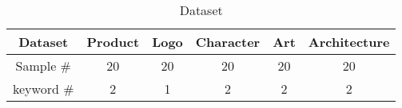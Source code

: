 \begin{table}[ht]
\vspace{-0.1in}
\caption{Dataset}
\label{table:table0}
\centering
    \begin{adjustbox}{width=0.6\linewidth}
        \small 
        \begin{tabular}{cccccc}
            \toprule
            Dataset&Product&Logo&Character&Art& Architecture\\
            \midrule
            Sample \#&20&20&20&20&20\\
            keyword \#&2&1&2&2&2\\
            \bottomrule
        \end{tabular}
    \end{adjustbox}
\end{table}

